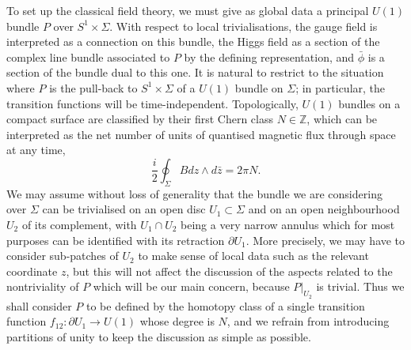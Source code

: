 \documentclass[a4paper,11pt]{article}
\begin{document}
To set up the classical field theory, we must give as global data a
principal $U(1)$ bundle ${P}$ over $S^{1}\times\Sigma$. With respect
to local trivialisations, the gauge
field is interpreted as
a connection on this bundle, the Higgs field as a section of 
the complex line bundle associated to ${P}$ by the defining 
representation, and $\bar{\phi}$ is a section of the bundle dual to this one.
It is natural to restrict to the situation 
where ${P}$ is the pull-back to $S^{1} \times \Sigma$ of a 
$U(1)$ bundle on $\Sigma$; in particular, the transition functions
will be time-independent. Topologically, $U(1)$ bundles on a compact
surface are classified by their first Chern class $N\in \mathbb{Z}$, 
which can be interpreted as the net number of units of quantised magnetic
flux through space at any time,
\begin{equation}\label{qflux}
\frac{i}{2} \oint_{\Sigma}Bdz\wedge d\bar{z}=2\pi N.
\end{equation}
We may assume without loss of generality that the bundle we are
considering over $\Sigma$ can be trivialised on an open disc 
$U_{1}\subset \Sigma$ and on an open neighbourhood $U_{2}$ of its
complement, with $U_{1}\cap U_{2}$ being a very narrow annulus
which for most purposes can be identified with its retraction
$\partial U_{1}$. More precisely, we may have to 
consider sub-patches of $U_{2}$ to make sense of local data such as
the relevant coordinate $z$, but this will not affect the discussion
of the aspects related to the nontriviality of ${P}$ which will be 
our main concern, because ${P}|_{U_{2}}$ is trivial. Thus we shall 
consider ${P}$ to be defined by the homotopy class of a single
transition function $f_{12}:\partial U_{1} \rightarrow U(1)$ whose 
degree is $N$, and we refrain from introducing partitions of unity 
to keep the discussion as simple as possible.
\end{document}
